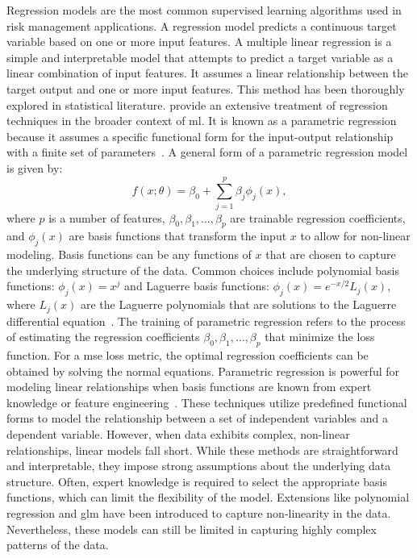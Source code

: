 Regression models are the most common supervised learning algorithms used in risk management applications.
A regression model predicts a continuous target variable based on one or more input features.
A multiple linear regression is a simple and interpretable model that attempts to predict a target variable as a linear combination of input features.
It assumes a linear relationship between the target output and one or more input features.
This method has been thoroughly explored in statistical literature.
\citet{bishop2006pattern} provide an extensive treatment of regression techniques in the broader context of \gls{ml}.
It is known as a parametric regression because it assumes a specific functional form for the input-output relationship with a finite set of parameters~\citep{seber2012linear}.
A general form of a parametric regression model is given by:
\begin{equation} \label{eq:regression}
    f(x; \theta) = \beta_0 + \sum_{j=1}^{p} \beta_j \phi_j(x),
\end{equation}
where $p$ is a number of features, $\beta_0, \beta_1, \ldots, \beta_p$ are trainable regression coefficients, and $\phi_j(x)$ are basis functions that transform the input $x$ to allow for non-linear modeling.
Basis functions can be any functions of $x$ that are chosen to capture the underlying structure of the data.
Common choices include polynomial basis functions: $\phi_j(x) = x^j$ and Laguerre basis functions: $\phi_j(x) = e^{-x/2} L_j(x)$, where $L_j(x)$ are the Laguerre polynomials that are solutions to the Laguerre differential equation~\citep{szeg1939orthogonal}.
The training of parametric regression refers to the process of estimating the regression coefficients $\beta_0, \beta_1, \ldots, \beta_p$ that minimize the loss function.
For a \gls{mse} loss metric, the optimal regression coefficients can be obtained by solving the normal equations.
Parametric regression is powerful for modeling linear relationships when basis functions are known from expert knowledge or feature engineering~\citep{hastie2009elements}.
These techniques utilize predefined functional forms to model the relationship between a set of independent variables and a dependent variable.
However, when data exhibits complex, non-linear relationships, linear models fall short.
While these methods are straightforward and interpretable, they impose strong assumptions about the underlying data structure.
Often, expert knowledge is required to select the appropriate basis functions, which can limit the flexibility of the model.
Extensions like polynomial regression and \gls{glm} have been introduced to capture non-linearity in the data.
Nevertheless, these models can still be limited in capturing highly complex patterns of the data.

